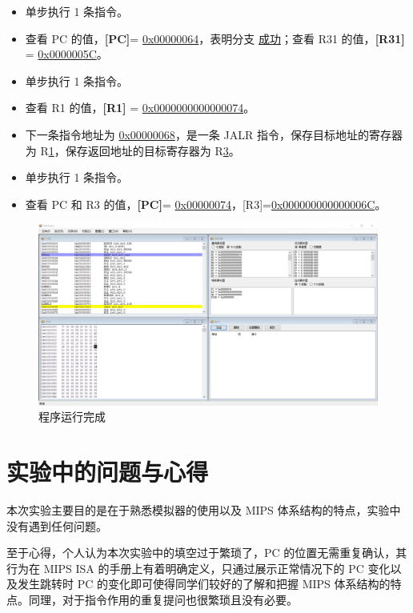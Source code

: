\documentclass[blue,normal,cn]{elegantnote}
\begin{document}
\begin{enumerate}[wide=0pt, listparindent=2em, parsep=0pt]
\begin{itemize}[leftmargin=3em]
              \item 单步执行 1 条指令。
              \item 查看 PC 的值，\textbf{[PC]}= \uline{0x00000064}，表明分支 \uline{成功}；查看 R31 的值，\textbf{[R31]} = \uline{0x0000005C}。
              \item 单步执行 1 条指令。
              \item 查看 R1 的值，\textbf{[R1]} = \uline{0x0000000000000074}。
              \item 下一条指令地址为 \uline{0x00000068}，是一条 JALR 指令，保存目标地址的寄存器为 R\uline{1}，保存返回地址的目标寄存器为 R\uline{3}。
              \item 单步执行 1 条指令。
              \item 查看 PC 和 R3 的值，\textbf{[PC]}= \uline{0x00000074}，[R3]=\uline{0x000000000000006C}。
          \end{itemize}
          \begin{figure}[H]
              \centering
              \includegraphics[width=1\textwidth]{fig/fin_alltest.png}
              \caption{程序运行完成}
              \label{fig:fin_alltest}
          \end{figure}
\end{enumerate}

\section{实验中的问题与心得}

本次实验主要目的是在于熟悉模拟器的使用以及 MIPS 体系结构的特点，实验中没有遇到任何问题。

至于心得，个人认为本次实验中的填空过于繁琐了，PC 的位置无需重复确认，其行为在 MIPS ISA 的手册上有着明确定义，只通过展示正常情况下的 PC 变化以及发生跳转时 PC 的变化即可使得同学们较好的了解和把握 MIPS 体系结构的特点。同理，对于指令作用的重复提问也很繁琐且没有必要。
\end{document}
